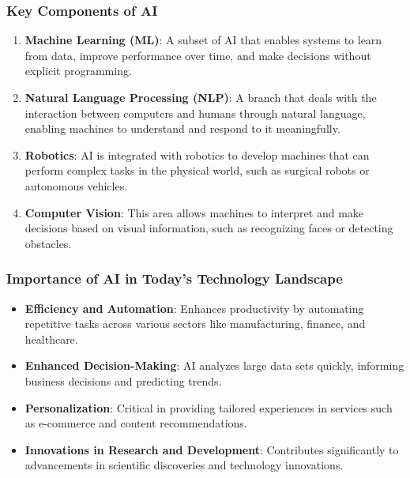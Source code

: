 \documentclass[aspectratio=169]{beamer}
\begin{document}
\begin{frame}[fragile]
    \frametitle{Key Components of AI}
    \begin{enumerate}
        \item \textbf{Machine Learning (ML)}: A subset of AI that enables systems to learn from data, improve performance over time, and make decisions without explicit programming.
        
        \item \textbf{Natural Language Processing (NLP)}: A branch that deals with the interaction between computers and humans through natural language, enabling machines to understand and respond to it meaningfully.
        
        \item \textbf{Robotics}: AI is integrated with robotics to develop machines that can perform complex tasks in the physical world, such as surgical robots or autonomous vehicles.
        
        \item \textbf{Computer Vision}: This area allows machines to interpret and make decisions based on visual information, such as recognizing faces or detecting obstacles.
    \end{enumerate}
\end{frame}

\begin{frame}[fragile]
    \frametitle{Importance of AI in Today’s Technology Landscape}
    \begin{itemize}
        \item \textbf{Efficiency and Automation}: Enhances productivity by automating repetitive tasks across various sectors like manufacturing, finance, and healthcare.
        
        \item \textbf{Enhanced Decision-Making}: AI analyzes large data sets quickly, informing business decisions and predicting trends.
        
        \item \textbf{Personalization}: Critical in providing tailored experiences in services such as e-commerce and content recommendations.
        
        \item \textbf{Innovations in Research and Development}: Contributes significantly to advancements in scientific discoveries and technology innovations.
    \end{itemize}
\end{frame}
\end{document}
